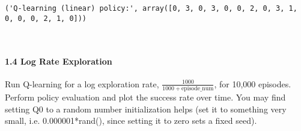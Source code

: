 \documentclass[11pt]{article}
\begin{document}
    \begin{Verbatim}[commandchars=\\\{\}]
('Q-learning (linear) policy:', array([0, 3, 0, 3, 0, 0, 2, 0, 3, 1, 0, 0, 0, 2, 1, 0]))

    \end{Verbatim}

    \begin{center}
    \end{center}
    { \hspace*{\fill} \\}
    
    \paragraph{1.4 Log Rate Exploration}\label{log-rate-exploration}

Run Q-learning for a log exploration rate,
\(\frac{1000}{1000+\text{episode\_num}}\), for 10,000 episodes. Perform
policy evaluation and plot the success rate over time. You may find
setting Q0 to a random number initialization helps (set it to something
very small, i.e. 0.000001*rand(), since setting it to zero sets a fixed
seed).
\end{document}
